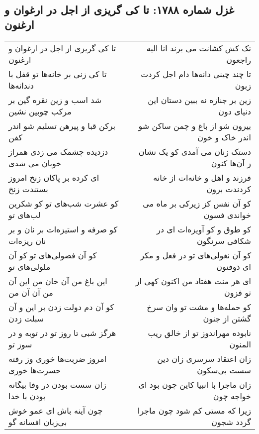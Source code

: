 \begin{center}
\section*{غزل شماره ۱۷۸۸: تا کی گریزی از اجل در ارغوان و ارغنون}
\label{sec:1788}
\begin{longtable}{l p{0.5cm} r}
تا کی گریزی از اجل در ارغوان و ارغنون
&&
نک کش کشانت می برند انا الیه راجعون
\\
تا کی زنی بر خانه‌ها تو قفل با دندانه‌ها
&&
تا چند چینی دانه‌ها دام اجل کردت زبون
\\
شد اسب و زین نقره گین بر مرکب چوبین نشین
&&
زین بر جنازه نه ببین دستان این دنیای دون
\\
برکن قبا و پیرهن تسلیم شو اندر کفن
&&
بیرون شو از باغ و چمن ساکن شو اندر خاک و خون
\\
دزدیده چشمک می زدی همراز خوبان می شدی
&&
دستک زنان می آمدی کو یک نشان ز آن‌ها کنون
\\
ای کرده بر پاکان زنخ امروز بستندت زنخ
&&
فرزند و اهل و خانه‌ات از خانه کردندت برون
\\
کو عشرت شب‌های تو کو شکرین لب‌های تو
&&
کو آن نفس کز زیرکی بر ماه می خواندی فسون
\\
کو صرفه و استیزه‌ات بر نان و بر نان ریزه‌ات
&&
کو طوق و کو آویزه‌ات ای در شکافی سرنگون
\\
کو آن فضولی‌های تو کو آن ملولی‌های تو
&&
کو آن نغولی‌های تو در فعل و مکر ای ذوفنون
\\
این باغ من آن خان من این آن من آن آن من
&&
ای هر منت هفتاد من اکنون کهی از تو فزون
\\
کو آن دم دولت زدن بر این و آن سبلت زدن
&&
کو حمله‌ها و مشت تو وان سرخ گشتن از جنون
\\
هرگز شبی تا روز تو در توبه و در سوز تو
&&
نابوده مهراندوز تو از خالق ریب المنون
\\
امروز ضربت‌ها خوری وز رفته حسرت‌ها خوری
&&
زان اعتقاد سرسری زان دین سست بی‌سکون
\\
زان سست بودن در وفا بیگانه بودن با خدا
&&
زان ماجرا با انبیا کاین چون بود ای خواجه چون
\\
چون آینه باش ای عمو خوش بی‌زبان افسانه گو
&&
زیرا که مستی کم شود چون ماجرا گردد شجون
\\
\end{longtable}
\end{center}
